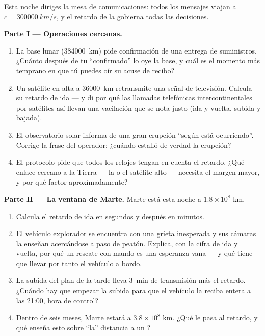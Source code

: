 \begin{problem}\label{pb:g8:speed-of-light:1}
Esta noche diriges la mesa de comunicaciones: todos los mensajes viajan
a $c = \qty{300000}{km/s}$, y el retardo de la  gobierna todas las
decisiones.

\medskip\noindent\textbf{Parte I --- Operaciones cercanas.}
\begin{enumerate}
  \item La base lunar (\qty{384000}{km}) pide confirmación de una
        entrega de suministros. ¿Cuánto después de tu ``confirmado''
        lo oye la base, y cuál es el momento más temprano en que tú
        puedes oír su acuse de recibo?
  \item Un satélite en  alta a \qty{36000}{km} retransmite
        una señal de televisión. Calcula su retardo de ida --- y di
        por qué las llamadas telefónicas intercontinentales por
        satélites así llevan una vacilación que se nota justo (ida y
        vuelta, subida y bajada).
  \item El observatorio solar informa de una gran erupción ``según
        está ocurriendo''. Corrige la frase del operador: ¿cuándo
        estalló de verdad la erupción?
  \item El protocolo pide que todos los relojes tengan en cuenta el
        retardo. ¿Qué enlace cercano a la Tierra --- la
         o el satélite alto --- necesita el margen mayor, y
        por qué factor aproximadamente?
\end{enumerate}

\medskip\noindent\textbf{Parte II --- La ventana de Marte.}
Marte está esta noche a $1.8 \times 10^{8}$ km.
\begin{enumerate}[resume]
  \item Calcula el retardo de ida en segundos y después en minutos.
  \item El vehículo explorador se encuentra con una grieta
        inesperada y sus cámaras la enseñan acercándose a paso de
        peatón. Explica, con la cifra de ida y vuelta, por qué un
        rescate con mando es una esperanza vana --- y qué tiene que
        llevar por tanto el vehículo a bordo.
  \item La subida del plan de la tarde lleva \qty{3}{min} de
        transmisión más el retardo. ¿Cuándo hay que empezar la
        subida para que el vehículo la reciba entera a las 21:00,
        hora de control?
  \item Dentro de seis meses, Marte estará a $3.8 \times 10^{8}$ km.
        ¿Qué le pasa al retardo, y qué enseña esto sobre ``la''
        distancia a un ?
\end{enumerate}


\end{problem}
